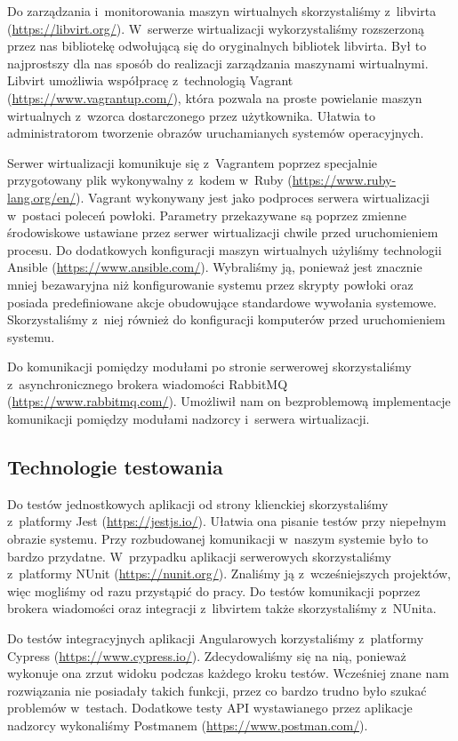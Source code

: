 \documentclass[../opis-rozwiazania.tex]{subfiles}
\begin{document}
Do zarządzania i~monitorowania maszyn wirtualnych skorzystaliśmy z~libvirta (\url{https://libvirt.org/}).
W~serwerze wirtualizacji wykorzystaliśmy rozszerzoną przez nas bibliotekę odwołującą się do oryginalnych bibliotek libvirta.
Był to najprostszy dla nas sposób do realizacji zarządzania maszynami wirtualnymi.
Libvirt umożliwia współpracę z~technologią Vagrant (\url{https://www.vagrantup.com/}), która pozwala na proste powielanie maszyn wirtualnych z~wzorca dostarczonego przez użytkownika.
Ułatwia to administratorom tworzenie obrazów uruchamianych systemów operacyjnych.

Serwer wirtualizacji komunikuje się z~Vagrantem poprzez specjalnie przygotowany plik wykonywalny z~kodem w~Ruby (\url{https://www.ruby-lang.org/en/}).
Vagrant wykonywany jest jako podproces serwera wirtualizacji w~postaci poleceń powłoki.
Parametry przekazywane są poprzez zmienne środowiskowe ustawiane przez serwer wirtualizacji chwile przed uruchomieniem procesu.
Do dodatkowych konfiguracji maszyn wirtualnych użyliśmy technologii Ansible (\url{https://www.ansible.com/}).
Wybraliśmy ją, ponieważ jest znacznie mniej bezawaryjna niż konfigurowanie systemu przez skrypty powłoki oraz posiada predefiniowane akcje obudowujące standardowe wywołania systemowe.
Skorzystaliśmy z~niej również do konfiguracji komputerów przed uruchomieniem systemu.

Do komunikacji pomiędzy modułami po stronie serwerowej skorzystaliśmy z~asynchronicznego brokera wiadomości RabbitMQ (\url{https://www.rabbitmq.com/}).
Umożliwił nam on bezproblemową implementacje komunikacji pomiędzy modułami nadzorcy i~serwera wirtualizacji.

\subsection{Technologie testowania}
Do testów jednostkowych aplikacji od strony klienckiej skorzystaliśmy z~platformy Jest (\url{https://jestjs.io/}).
Ułatwia ona pisanie testów przy niepełnym obrazie systemu. Przy rozbudowanej komunikacji w~naszym systemie było to bardzo przydatne.
W~przypadku aplikacji serwerowych skorzystaliśmy z~platformy NUnit (\url{https://nunit.org/}).
Znaliśmy ją z~wcześniejszych projektów, więc mogliśmy od razu przystąpić do pracy.
Do testów komunikacji poprzez brokera wiadomości oraz integracji z~libvirtem także skorzystaliśmy z~NUnita.

Do testów integracyjnych aplikacji Angularowych korzystaliśmy z~platformy Cypress (\url{https://www.cypress.io/}).
Zdecydowaliśmy się na nią, ponieważ wykonuje ona zrzut widoku podczas każdego kroku testów.
Wcześniej znane nam rozwiązania nie posiadały takich funkcji, przez co bardzo trudno było szukać problemów w~testach.
Dodatkowe testy API wystawianego przez aplikacje nadzorcy wykonaliśmy Postmanem (\url{https://www.postman.com/}).
\end{document}
